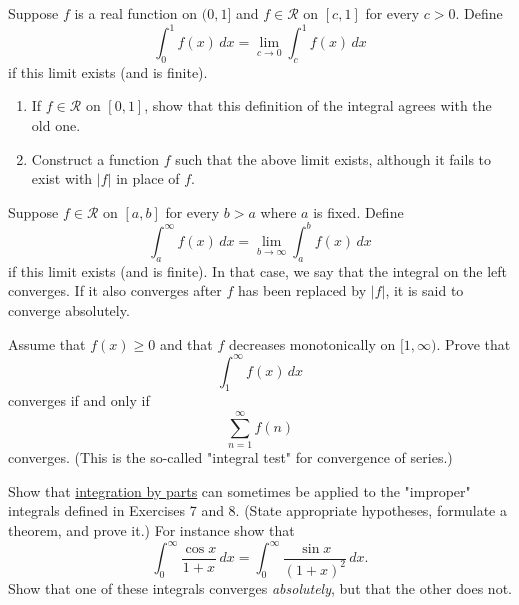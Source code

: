   \begin{exercise}[Rudin 6.7]
    Suppose $f$ is a real function on $(0, 1]$ and $f \in \mathscr{R}$ on $[c, 1]$ for every $c > 0$. Define
    \begin{equation}
      \int_0^1 f(x) \, dx = \lim_{c \to 0} \int_c^1 f(x) \, dx
    \end{equation}
    if this limit exists (and is finite).
    \begin{enumerate}
      \item[(a)] If $f \in \mathscr{R}$ on $[0, 1]$, show that this definition of the integral agrees with the old one.
      \item[(b)] Construct a function $f$ such that the above limit exists, although it fails to exist with $|f|$ in place of $f$.
    \end{enumerate}
  \end{exercise}
  \begin{solution}

  \end{solution}

  \begin{exercise}[Rudin 6.8]
    Suppose $f \in \mathscr{R}$ on $[a, b]$ for every $b > a$ where $a$ is fixed. Define
    \begin{equation}
      \int_a^\infty f(x) \, dx = \lim_{b \to \infty} \int_a^b f(x) \, dx
    \end{equation}
    if this limit exists (and is finite). In that case, we say that the integral on the left converges. If it also converges after $f$ has been replaced by $|f|$, it is said to converge absolutely.
    \par Assume that $f(x) \ge 0$ and that $f$ decreases monotonically on $[1, \infty)$. Prove that
    \begin{equation}
      \int_1^\infty f(x) \, dx
    \end{equation}
    converges if and only if
    \begin{equation}
      \sum_{n=1}^\infty f(n)
    \end{equation}
    converges. (This is the so-called "integral test" for convergence of series.)
  \end{exercise}
  \begin{solution}

  \end{solution}

  \begin{exercise}[Rudin 6.9]
    Show that \hyperref[thm:integration-by-parts]{integration by parts} can sometimes be applied to the "improper" integrals defined in Exercises 7 and 8. (State appropriate hypotheses, formulate a theorem, and prove it.) For instance show that
    \begin{equation}
      \int_0^\infty \frac{\cos x}{1 + x} \, dx = \int_0^\infty \frac{\sin x}{(1 + x)^2} \, dx.
    \end{equation}
    Show that one of these integrals converges \textit{absolutely}, but that the other does not.
  \end{exercise}
  \begin{solution}

  \end{solution}


